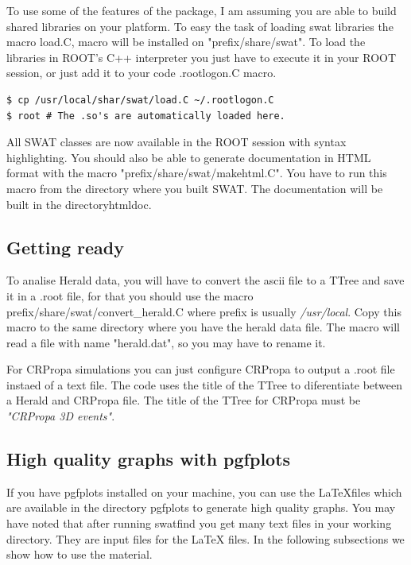 \documentclass[12pt]{article}
\begin{document}
To use some of the features of the package, I am assuming you are able to build
shared libraries on your platform.  To easy the task of loading swat libraries
the macro load.C, macro will be installed on
{\color{brown}"prefix/share/swat"}. To load the libraries in ROOT's C++
interpreter you just have to execute it in your ROOT session, or just
add it to your code {\color{brown}.rootlogon.C} macro.

{ \color{brown}
\begin{lstlisting}
$ cp /usr/local/shar/swat/load.C ~/.rootlogon.C
$ root # The .so's are automatically loaded here.
\end{lstlisting}
}

All SWAT classes are now available in the ROOT session with syntax
highlighting. You should also be able to generate documentation in HTML format
with the macro {\color{brown}"prefix/share/swat/makehtml.C"}. You have to run
this macro from the directory where you built SWAT. The documentation will be
built in the directory{\color{brown}htmldoc}.

\subsection{Getting ready} \label{ch::ready}
To analise Herald data, you will have to convert the ascii file to a TTree and
save it in a .root file, for that you should use the macro
{\color{brown}prefix/share/swat/convert\_herald.C} where prefix is usually
\textit{/usr/local}.  Copy this macro to the same directory where you have the
herald data file. The macro will read a file with name
{\color{brown}"herald.dat"}, so you may have to rename it. 

For CRPropa simulations you can just configure CRPropa to output a .root file
instaed of a text file.  The code uses the title of the TTree to diferentiate
between a Herald and CRPropa file. The title of the TTree for CRPropa must be
\textit{\color{brown}"CRPropa 3D events"}.

\subsection{High quality graphs with pgfplots} \label{ch::pgfplots}
If you have pgfplots installed on your machine, you can use the \LaTeX files
which are available in the directory pgfplots to generate high quality
graphs. You may have noted that after running {\color{brown}swatfind} you get
many text files in your working directory. They are input files for the \LaTeX
files. In the following subsections we show how to use the material.
\end{document}
